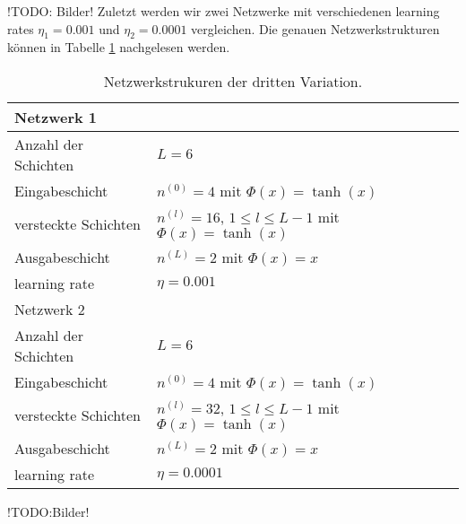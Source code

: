 !TODO: Bilder!
Zuletzt werden wir zwei Netzwerke mit verschiedenen learning rates $\eta_1=0.001$ und $\eta_2=0.0001$ vergleichen. Die
genauen Netzwerkstrukturen können in Tabelle \ref{stiff-table-third} nachgelesen werden.
\begin{table}
       \renewcommand{\arraystretch}{1.0}
       \centering
       \begin{tabular}{ l | l }
              \hline
              Netzwerk 1 & \\
              \hline
              Anzahl der Schichten & $L=6$ \\
              Eingabeschicht & $n^{(0)}=4$ mit $\Phi(x)=\tanh(x)$ \\
              versteckte Schichten & $n^{(l)}=16$, $1\leq l \leq L-1$ mit $\Phi(x)=\tanh(x)$ \\
              Ausgabeschicht & $n^{(L)}=2$ mit $\Phi(x)=x$ \\
              learning rate & $\eta=0.001$ \\
              \hline
              Netzwerk 2 & \\
              \hline
              Anzahl der Schichten & $L=6$ \\
              Eingabeschicht & $n^{(0)}=4$ mit $\Phi(x)=\tanh(x)$ \\
              versteckte Schichten & $n^{(l)}=32$, $1\leq l \leq L-1$ mit $\Phi(x)=\tanh(x)$ \\
              Ausgabeschicht & $n^{(L)}=2$ mit $\Phi(x)=x$ \\
              learning rate & $\eta=0.0001$ \\
              \hline
       \end{tabular}
       \caption{Netzwerkstrukuren der dritten Variation.}
       \label{stiff-table-third}
\end{table}
!TODO:Bilder!